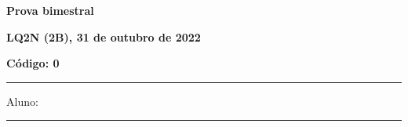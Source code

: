 \documentclass[12pt, addpoints]{exam}
\begin{document}
        \begin{minipage}[b]{0.75\linewidth}
            \begin{flushleft}
                {\bf \large Prova bimestral}
            \end{flushleft}
            \begin{flushleft}
                {\bf \large LQ2N (2B), 31 de outubro de 2022}
            \end{flushleft}
        \end{minipage}
        \begin{minipage}[b]{0.20\linewidth}
            \begin{flushright}
                {\bf \large Código: 0}
            \end{flushright}
        \end{minipage}
        \vspace{0.5cm} \hrule \vspace{0.5cm}
        \begin{minipage}{0.75\linewidth}
            Aluno:
        \end{minipage}
        \vspace{0.5cm} \hrule \vspace{0.5cm}
\end{document}
